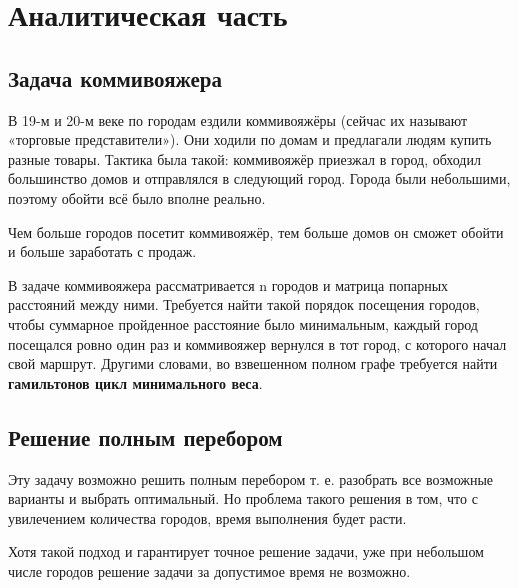 \chapter{Аналитическая часть}

\section{Задача коммивояжера}

В 19-м и 20-м веке по городам ездили коммивояжёры (сейчас их называют «торговые представители»). Они ходили по домам и предлагали людям купить разные товары. Тактика была такой: коммивояжёр приезжал в город, обходил большинство домов и отправлялся в следующий город. Города были небольшими, поэтому обойти всё было вполне реально.

Чем больше городов посетит коммивояжёр, тем больше домов он сможет обойти и больше заработать с продаж. %





В задаче коммивояжера рассматривается n городов и матрица
попарных расстояний между ними. Требуется найти такой порядок  посещения  городов,  чтобы  суммарное  пройденное  расстояние было минимальным, каждый город посещался ровно один раз 
и  коммивояжер  вернулся  в  тот  город,  с  которого  начал  свой  маршрут.  Другими  словами,  во  взвешенном  полном  графе  требуется найти \textbf{гамильтонов цикл минимального веса}.


\section{Решение полным перебором}

Эту задачу возможно решить полным перебором т. е. разобрать все возможные варианты и выбрать оптимальный. Но проблема такого решения в том, что с увилечением количества городов, время выполнения будет расти.

Хотя такой подход и гарантирует точное решение задачи, уже при небольшом числе городов решение задачи за допустимое время не возможно.

